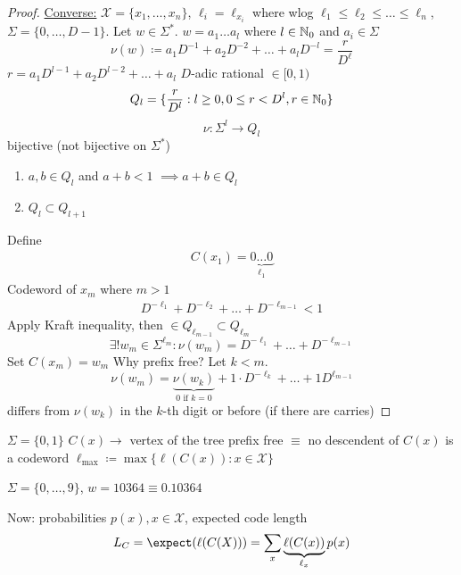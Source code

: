 \documentclass[mfit.tex]{subfiles}
\begin{document}
\begin{proof}
  \underline{Converse:}
  $\mathcal{X} = \{x_1,\dots,x_n\}$, $\ell_i = \ell_{x_i}$ where wlog $\ell_1 \leq \ell_2 \leq \dots \leq \ell_n$,
  $\Sigma = \{0,\dots,D-1\}$.
  Let $w \in \Sigma^\ast$. $w = a_1 \dots a_l$ where $l \in \mathbb{N}_0$ and $a_i \in \Sigma$
  \[ \nu(w) \coloneqq a_1 D^{-1} + a_2 D^{-2} + \dots + a_l D^{-l} = \frac{r}{D^\ell} \]
  $r = a_1 D^{l-1} + a_2 D^{l-2} + \dots + a_l$
  $D$-adic rational $\in [0,1)$
  \[ Q_l = \{ \frac{r}{D^l}: l \geq 0, 0 \leq r < D^l, r \in \mathbb{N}_0 \} \]
  \[ \nu: \Sigma^l \to Q_l \]
  bijective (not bijective on $\Sigma^\ast$)
  \begin{enumerate}
    \item $a,b \in Q_l$ and $a + b < 1$ $\implies a+b \in Q_l$
    \item $Q_l \subset Q_{l+1}$
  \end{enumerate}
  Define
  \begin{align*}
    C(x_1) = \underbrace{0 \dots 0}_{\ell_1}
  \end{align*}
  Codeword of $x_m$ where $m > 1$
  \begin{align*}
    D^{-\ell_1} + D^{- \ell_2} + \dots + D^{-\ell_{m-1}} < 1
  \end{align*}
  Apply Kraft inequality, then $\in Q_{\ell_{m-1}} \subset Q_{\ell_m}$
  \[ \exists! w_m \in \Sigma^{\ell_m}: \nu(w_m) = D^{-\ell_1} + \dots + D^{-\ell_{m-1}} \]
  Set $C(x_m) = w_m$
  Why prefix free? Let $k < m$.
  \[ \nu(w_m) = \underbrace{\nu(w_k)}_{0 \text{ if } k = 0} + 1 \cdot D^{-\ell_k} + \dots + 1 D^{\ell_{m-1}} \]
  differs from $\nu(w_k)$ in the $k$-th digit or before (if there are carries)
\end{proof}

\begin{ex}
  $\Sigma = \{0,1\}$
  $C(x) \to$ vertex of the tree
  prefix free $\equiv$ no descendent of $C(x)$ is a codeword
  $\ell_\max \coloneqq \max \{ \ell(C(x)): x \in \mathcal{X} \}$
\end{ex}

\begin{ex}
  $\Sigma = \{0,\dots,9\}$, $w = 10364 \equiv 0.10364$
\end{ex}

Now: probabilities $p(x), x \in \mathcal{X}$, expected code length
\[ L_C = \expect(\ell(C(X))) = \sum_{x} \underbrace{\ell(C(x))}_{\ell_x} p(x) \]
\end{document}
